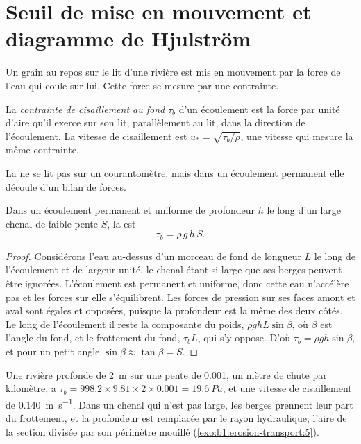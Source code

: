 \section{Seuil de mise en mouvement et diagramme de Hjulström}\label{sec:b1:erosion-transport:threshold}

Un grain au repos sur le lit d'une rivière est mis en mouvement par la force de l'eau
qui coule sur lui. Cette force se mesure par une contrainte.

\begin{definition}\label{def:b1:erosion-transport:bed-shear}
La \emph{contrainte de cisaillement au fond} $\tau_b$ d'un écoulement est la
force par unité d'aire qu'il exerce sur son lit, parallèlement au lit, dans la
direction de l'écoulement. La vitesse de cisaillement est $u_* = \sqrt{\tau_b/\rho}$, une
vitesse qui mesure la même contrainte.
\end{definition}

La  ne se lit pas sur un courantomètre, mais dans un écoulement
permanent elle découle d'un bilan de forces.

\begin{proposition}\label{prop:b1:erosion-transport:depth-slope}
Dans un écoulement permanent et uniforme de profondeur $h$ le long d'un large chenal de faible pente $S$,
la  est
\[
  \tau_b = \rho\,g\,h\,S .
\]
\end{proposition}

\begin{proof}
Considérons l'eau au-dessus d'un morceau de fond de longueur $L$ le long de l'écoulement et de
largeur unité, le chenal étant si large que ses berges peuvent être ignorées. L'écoulement
est permanent et uniforme, donc cette eau n'accélère pas et les forces sur elle
s'équilibrent. Les forces de pression sur ses faces amont et aval sont égales et
opposées, puisque la profondeur est la même des deux côtés. Le long de l'écoulement il reste la
composante du poids, $\rho g h L \sin\beta$, où $\beta$ est l'angle du
fond, et le frottement du fond, $\tau_b L$, qui s'y oppose. D'où $\tau_b
= \rho g h \sin\beta$, et pour un petit angle $\sin\beta \approx \tan\beta = S$.
\end{proof}

Une rivière profonde de \qty{2}{m} sur une pente de \num{0.001}, un mètre de chute par
kilomètre, a $\tau_b = 998.2 \times 9.81 \times 2 \times 0.001 =
\qty{19.6}{Pa}$, et une vitesse de cisaillement de \qty{0.140}{m.s^{-1}}. Dans un chenal
qui n'est pas large, les berges prennent leur part du frottement, et la profondeur est
remplacée par le rayon hydraulique, l'aire de la section divisée par son périmètre
mouillé (\cref{exo:b1:erosion-transport:5}).

